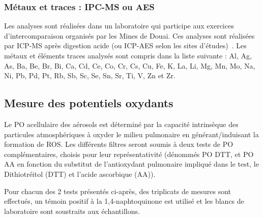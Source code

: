 
\subsubsection{Métaux et traces : IPC-MS ou AES}%
\label{ssub:métaux_et_traces}

Les analyses sont réalisées dans un laboratoire qui
participe aux exercices d’intercomparaison organisés par les Mines de Douai. Ces analyses
sont réalisées par ICP-MS après digestion acide (ou ICP-AES selon les sites
d'études)~\autocite{allemanPM102010,mbengueSizedistributed2014,cenAmbient2005}.
Les métaux et éléments traces analysés sont compris dans la liste suivante : Al, Ag, As,
Ba, Be, Br, Bi, Ca, Cd, Ce, Co, Cr, Cs, Cu, Fe, K, La, Li, Mg, Mn, Mo, Na, Ni, Pb, Pd, Pt,
Rb, Sb, Sc, Se, Sn, Sr, Ti, V, Zn et Zr.

\subsection{Mesure des potentiels oxydants}%
\label{sub:potentiels_oxydants}

Le PO acellulaire des aérosols est déterminé par la capacité intrinsèque des particules
atmosphériques à oxyder le milieu pulmonaire en générant/induisant la formation de ROS.
Les différents filtres seront soumis à deux tests de PO complémentaires, choisis pour
leur représentativité (dénommés PO DTT, et PO AA en fonction du substitut de
l’antioxydant pulmonaire impliqué dans le test, le Dithiotréitol (DTT) et l’acide
ascorbique (AA)). 

Pour chacun des 2 tests présentés ci-après, des triplicats de mesures sont effectués, un
témoin positif à la 1,4-naphtoquinone est utilisé et les blancs de laboratoire sont
soustraits aux échantillons.

